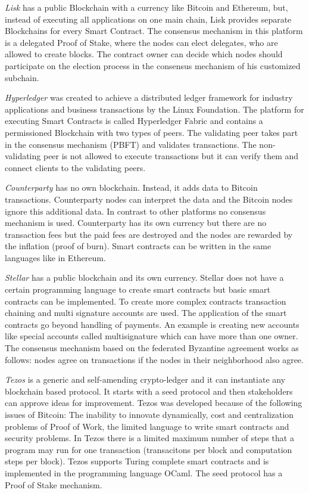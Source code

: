 \documentclass[conference]{IEEEtran}
\begin{document}
\textit{Lisk} has a public Blockchain with a currency like Bitcoin and Ethereum, but, instead of executing all applications on one main chain, Lisk provides separate Blockchains for every Smart Contract. The consensus mechanism in this platform is a delegated Proof of Stake, where the nodes can elect delegates, who are allowed to create blocks. The contract owner can decide which nodes should participate on the election process in the consensus mechanism of his customized subchain. \cite{Bartoletti2017} \par 
\textit{Hyperledger} was created to achieve a distributed ledger framework for industry applications and business transactions by the Linux Foundation. The platform for executing Smart Contracts is called Hyperledger Fabric and contains a permissioned Blockchain with two types of peers. The validating peer takes part in the consensus mechanism (PBFT) and validates transactions. The non-validating peer is not allowed to execute transactions but it can verify them and connect clients to the validating peers.\cite{Cachin2016} \par 
\textit{Counterparty} has no own blockchain. Instead, it adds data to Bitcoin transactions. Counterparty nodes can interpret the data and the Bitcoin nodes ignore this additional data. In contrast to other platforms no consensus mechanism is used. Counterparty has its own currency but there are no transaction fees but the paid fees are destroyed and the nodes are rewarded by the inflation (proof of burn). Smart contracts can be written in the same languages like in Ethereum. \cite{Bartoletti2017} \par 
\textit{Stellar} has a public blockchain and its own currency. Stellar does not have a certain programming language to create smart contracts but basic smart contracts can be implemented. To create more complex contracts transaction chaining and multi signature accounts are used. The application of the smart contracts go beyond handling of payments. An example is creating new accounts like special accounts called multisignature which can have more than one owner. The consensus mechanism based on the federated Byzantine agreement works as follows: nodes agree on transactions if the nodes in their neighborhood also agree.\cite{Bartoletti2017} \par 
\textit{Tezos} is a generic and self-amending crypto-ledger and it can instantiate any blockchain based protocol. It starts with a seed protocol and then stakeholders can approve ideas for improvement. Tezos was developed because of the following issues of Bitcoin: The inability to innovate dynamically, cost and centralization problems of Proof of Work, the limited language to write smart contracts and security problems. In Tezos there is a limited maximum number of steps that a program may run for one transaction (transacitons per block and computation steps per block). Tezos supports Turing complete smart contracts and is implemented in the programming language OCaml. The seed protocol has a Proof of Stake mechanism.  \cite{Goodman2014}\cite{Goodman2014a} \par 
\end{document}
